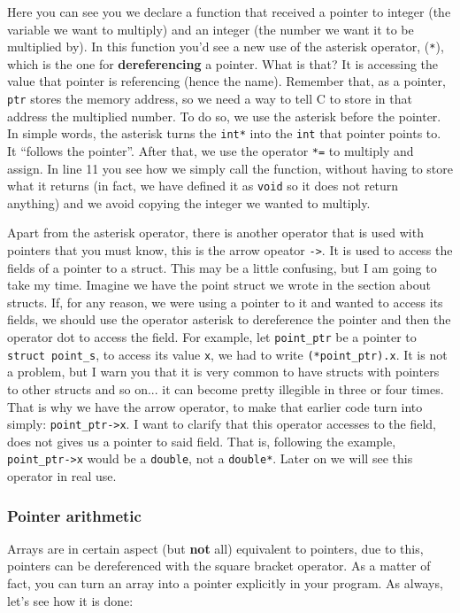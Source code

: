 \documentclass[a4paper]{article}
\begin{document}
Here you can see you we declare a function that received a pointer to integer
(the variable we want to multiply) and an integer (the number we want it to
be multiplied by). In this function you'd see a new use of the asterisk
operator, (\verb!*!), which is the one for \textbf{dereferencing} a pointer.
What is that? It is accessing the value that pointer is referencing (hence the
name). Remember that, as a pointer, \verb!ptr! stores the memory address, so we
need a way to tell C to store in that address the multiplied number. To do so,
we use the asterisk before the pointer. In simple words, the asterisk turns the
\verb!int*! into the \verb!int! that pointer points to. It ``follows the
pointer''. After that, we use the operator
\verb!*=! to multiply and assign. In line 11 you see how we simply call the
function, without having to store what it returns (in fact, we have defined it
as \verb!void! so it does not return anything) and we avoid copying the integer
we wanted to multiply.

Apart from the asterisk operator, there is another operator that is used with
pointers that you must know, this is the arrow opeator \verb!->!. It is used to
access the fields of a pointer to a struct. This may be a little confusing, but
I am going to take my time. Imagine we have the point struct we wrote in the
section about structs. If, for any reason, we were using a pointer to it and
wanted to access its fields, we should use the operator asterisk to dereference
the pointer and then the operator dot to access the field. For example, let
\verb!point_ptr! be a pointer to \verb!struct point_s!, to access its value
\verb!x!, we had to write \verb!(*point_ptr).x!. It is not a problem, but I warn
you that it is very common to have structs with pointers to other structs and so
on... it can become pretty illegible in three or four times. That is why we have
the arrow operator, to make that earlier code turn into simply:
\verb!point_ptr->x!. I want to clarify that this operator accesses to the field,
does not gives us a pointer to said field. That is, following the example,
\verb!point_ptr->x! would be a \verb!double!, not a \verb!double*!. Later on we
will see this operator in real use.

\subsubsection{Pointer arithmetic}
Arrays are in certain aspect (but \textbf{not} all) equivalent to pointers, due
to this, pointers can be dereferenced with the square bracket operator. As a
matter of fact, you can turn an array into a pointer explicitly in your program.
As always, let's see how it is done:
\end{document}
